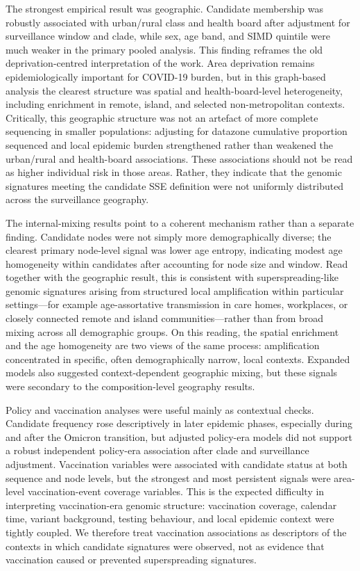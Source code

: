 \documentclass[10pt,letterpaper]{article}
\begin{document}
The strongest empirical result was geographic. Candidate membership was robustly associated with urban/rural class and health board after adjustment for surveillance window and clade, while sex, age band, and SIMD quintile were much weaker in the primary pooled analysis. This finding reframes the old deprivation-centred interpretation of the work. Area deprivation remains epidemiologically important for COVID-19 burden, but in this graph-based analysis the clearest structure was spatial and health-board-level heterogeneity, including enrichment in remote, island, and selected non-metropolitan contexts. Critically, this geographic structure was not an artefact of more complete sequencing in smaller populations: adjusting for datazone cumulative proportion sequenced and local epidemic burden strengthened rather than weakened the urban/rural and health-board associations. These associations should not be read as higher individual risk in those areas. Rather, they indicate that the genomic signatures meeting the candidate SSE definition were not uniformly distributed across the surveillance geography.

The internal-mixing results point to a coherent mechanism rather than a separate finding. Candidate nodes were not simply more demographically diverse; the clearest primary node-level signal was lower age entropy, indicating modest age homogeneity within candidates after accounting for node size and window. Read together with the geographic result, this is consistent with superspreading-like genomic signatures arising from structured local amplification within particular settings---for example age-assortative transmission in care homes, workplaces, or closely connected remote and island communities---rather than from broad mixing across all demographic groups. On this reading, the spatial enrichment and the age homogeneity are two views of the same process: amplification concentrated in specific, often demographically narrow, local contexts. Expanded models also suggested context-dependent geographic mixing, but these signals were secondary to the composition-level geography results.

Policy and vaccination analyses were useful mainly as contextual checks. Candidate frequency rose descriptively in later epidemic phases, especially during and after the Omicron transition, but adjusted policy-era models did not support a robust independent policy-era association after clade and surveillance adjustment. Vaccination variables were associated with candidate status at both sequence and node levels, but the strongest and most persistent signals were area-level vaccination-event coverage variables. This is the expected difficulty in interpreting vaccination-era genomic structure: vaccination coverage, calendar time, variant background, testing behaviour, and local epidemic context were tightly coupled. We therefore treat vaccination associations as descriptors of the contexts in which candidate signatures were observed, not as evidence that vaccination caused or prevented superspreading signatures.
\end{document}
